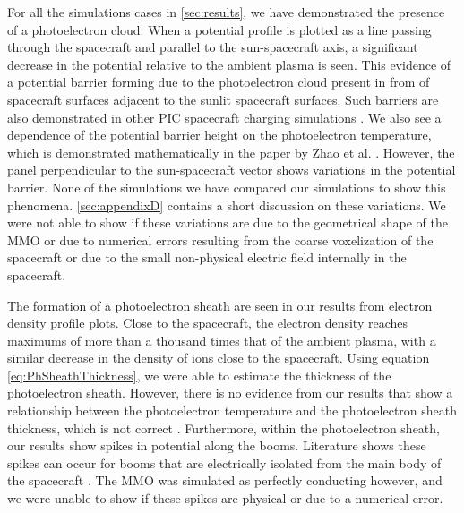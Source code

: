 For all the simulations cases in \cref{sec:results}, we have demonstrated the presence of a photoelectron cloud. When a potential profile is plotted as a line passing through the spacecraft and parallel to the sun-spacecraft axis, a significant decrease in the potential relative to the ambient plasma is seen. This evidence of a potential barrier forming due to the photoelectron cloud present in from of spacecraft surfaces adjacent to the sunlit spacecraft surfaces. Such barriers are also demonstrated in other PIC spacecraft charging simulations \parencite{Meyer-Vernet2007, Sjogren2012, Deca2013}. We also see a dependence of the potential barrier height on the photoelectron temperature, which is demonstrated mathematically in the paper by Zhao et al. \parencite{Zhao1996}. However, the panel perpendicular to the sun-spacecraft vector shows variations in the potential barrier. None of the simulations we have compared our simulations to show this phenomena. \cref{sec:appendixD} contains a short discussion on these variations. We were not able to show if these variations are due to the geometrical shape of the MMO or due to numerical errors resulting from the coarse voxelization of the spacecraft or due to the small non-physical electric field internally in the spacecraft.  

The formation of a photoelectron sheath are seen in our results from electron density profile plots. Close to the spacecraft, the electron density reaches maximums of more than a thousand times that of the ambient plasma, with a similar decrease in the density of ions close to the spacecraft. Using equation \eqref{eq:PhSheathThickness}, we were able to estimate the thickness of the photoelectron sheath. However, there is no evidence from our results that show a relationship between the photoelectron temperature and the photoelectron sheath thickness, which is not correct \parencite{Zhao1996}. Furthermore, within the photoelectron sheath, our results show spikes in potential along the booms. Literature shows these spikes can occur for booms that are electrically isolated from the main body of the spacecraft \parencite{LAI2019, Paulsson2019, Miyake2013}. The MMO was simulated as perfectly conducting however, and we were unable to show if these spikes are physical or due to a numerical error. 

